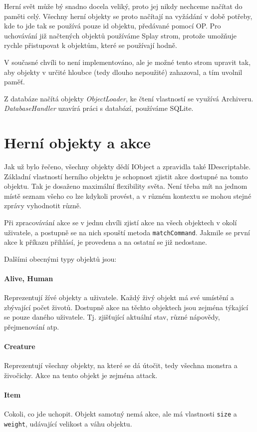 \documentclass[11pt, a4paper]{article}
\def\class#1{\emph{#1}}
\begin{document}
Herní svět může bý snadno docela veliký, proto jej nikdy nechceme načítat do paměti celý. Všechny herní objekty se proto načítají na vyžádání v době potřeby, kde to jde tak se používá pouze id objektu, předávané pomocí OP. Pro uchovávání již načtených objektů používáme Splay strom, protože umožňuje rychle přistupovat k objektům, které se používají hodně.

V současné chvíli to není implementováno, ale je možné tento strom upravit tak, aby objekty v určité hloubce (tedy dlouho nepoužité) zahazoval, a tím uvolnil paměť.

Z databáze načítá objekty \class{ObjectLoader}, ke čtení vlastností se využívá Archiveru. \class{DatabaseHandler} uzavírá práci s databází, používáme SQLite.

\section{Herní objekty a akce}

Jak už bylo řečeno, všechny objekty dědí IObject a zpravidla také IDescriptable. Základní vlastností herního objektu je schopnost zjistit akce dostupné na tomto objektu. Tak je dosaženo maximální flexibility světa. Není třeba mít na jednom místě seznam všeho co lze kdykoli provést, a v různém kontextu se mohou stejné zprávy vyhodnotit různě. 

Při zpracovávání akce se v jednu chvíli zjistí akce na všech objektech v okolí uživatele, a postupně se na nich spouští metoda \texttt{matchCommand}. Jakmile se první akce k příkazu přihlásí, je provedena a na ostatní se již nedostane.

Dalšími obecnými typy objektů jsou:

\paragraph{Alive, Human} Reprezentují žívé objekty a uživatele. Každý živý objekt má své umístění a zbývající počet životů. Dostupně akce na těchto objektech jsou zejména týkající se pouze daného uživatele. Tj. zjišťující aktuální stav, různé nápovědy, přejmenování atp.

\paragraph{Creature} Reprezentují všechny objekty, na které se dá útočit, tedy všechna monstra a živočichy. Akce na tento objekt je zejména attack.

\paragraph{Item} Cokoli, co jde uchopit. Objekt samotný nemá akce, ale má vlastnosti \texttt{size} a \texttt{weight}, udávající velikost a váhu objektu.
\end{document}

